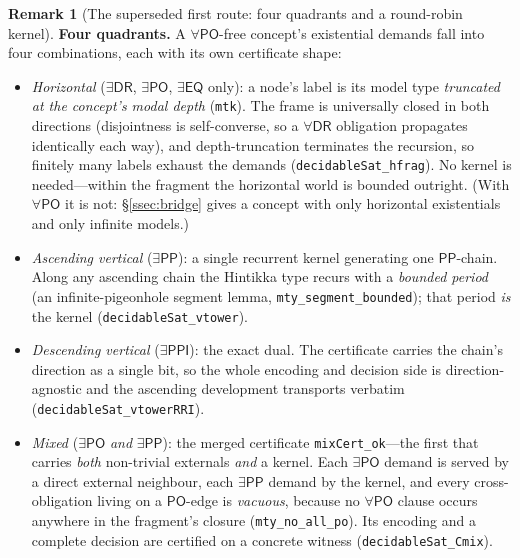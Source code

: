 \documentclass[11pt]{article}
\newcommand{\DR}{\mathsf{DR}}
\newcommand{\PO}{\mathsf{PO}}
\newcommand{\PP}{\mathsf{PP}}
\newcommand{\PPI}{\mathsf{PPI}}
\newcommand{\EQ}{\mathsf{EQ}}
\newcommand{\code}[1]{\texttt{#1}}
\theoremstyle{plain}
\theoremstyle{definition}
\newtheorem{remark}[theorem]{Remark}
\begin{document}
\begin{remark}[The superseded first route: four quadrants and a round-robin
kernel]
\textbf{Four quadrants.} A $\forall\PO$-free concept's existential demands
fall into four combinations, each with its own certificate shape:
\begin{itemize}
  \item \emph{Horizontal} ($\exists\DR$, $\exists\PO$, $\exists\EQ$ only): a
    node's label is its model type \emph{truncated at the concept's modal
    depth} (\code{mtk}). The frame is universally closed in both directions
    (disjointness is self-converse, so a $\forall\DR$ obligation propagates
    identically each way), and depth-truncation terminates the recursion, so
    finitely many labels exhaust the demands (\code{decidableSat\_hfrag}). No
    kernel is needed---within the fragment the horizontal world is bounded
    outright. (With $\forall\PO$ it is not: \S\ref{ssec:bridge} gives a
    concept with only horizontal existentials and only infinite models.)
  \item \emph{Ascending vertical} ($\exists\PP$): a single recurrent kernel
    generating one $\PP$-chain. Along any ascending chain the Hintikka type
    recurs with a \emph{bounded period} (an infinite-pigeonhole segment
    lemma, \code{mty\_segment\_bounded}); that period \emph{is} the kernel
    (\code{decidableSat\_vtower}).
  \item \emph{Descending vertical} ($\exists\PPI$): the exact dual. The
    certificate carries the chain's direction as a single bit, so the whole
    encoding and decision side is direction-agnostic and the ascending
    development transports verbatim (\code{decidableSat\_vtowerRRI}).
  \item \emph{Mixed} ($\exists\PO$ \emph{and} $\exists\PP$): the merged
    certificate \code{mixCert\_ok}---the first that carries \emph{both}
    non-trivial externals \emph{and} a kernel. Each $\exists\PO$ demand is
    served by a direct external neighbour, each $\exists\PP$ demand by the
    kernel, and every cross-obligation living on a $\PO$-edge is \emph{vacuous},
    because no $\forall\PO$ clause occurs anywhere in the fragment's closure
    (\code{mty\_no\_all\_po}). Its encoding and a complete decision are
    certified on a concrete witness (\code{decidableSat\_Cmix}).
\end{itemize}


\end{remark}
\end{document}
